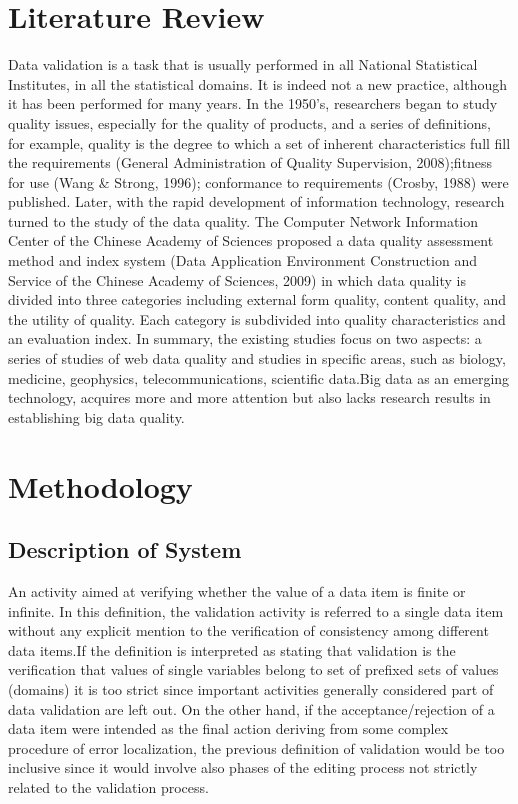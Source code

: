 \documentclass[12pt,]{article}
\begin{document}
\section{Literature Review}
Data validation is a task that is usually performed in all National Statistical Institutes, in all the statistical domains. It is indeed not a new practice, although it has been performed for many years. In the 1950's, researchers began to study quality issues, especially for the quality of products, and a series of definitions, for example, quality is the degree to which a set of inherent characteristics full fill the requirements (General Administration of Quality Supervision, 2008);fitness for use (Wang & Strong, 1996); conformance to requirements (Crosby, 1988) were published. Later, with the rapid development of information technology, research turned to the study of the data quality. 
The Computer Network Information Center of the Chinese Academy of Sciences proposed a data quality assessment method and index system (Data Application Environment Construction and Service of the Chinese Academy of Sciences, 2009) in which data quality is divided into three categories including external form quality, content quality, and the utility of quality. Each category is subdivided into quality characteristics and an evaluation index. 
In summary, the existing studies focus on two aspects: a series of studies of web data quality and studies in specific areas, such as biology, medicine, geophysics, telecommunications, scientific data.Big data as an emerging technology, acquires more and more attention but also lacks research results in establishing big data quality.

\section{Methodology}
\subsection{Description of System}
An activity aimed at verifying whether the value of a data item is finite or infinite.
In this definition, the validation activity is referred to a single data item without any explicit mention to the verification of consistency among different data items.If the definition is interpreted as stating that validation is the verification that values of single variables belong to set of prefixed sets of values (domains) it is too strict since important activities generally considered part of data validation are left out. On the other hand, if the acceptance/rejection of a data item were intended as the final action deriving from some complex procedure of error localization, the previous definition of validation would be too inclusive since it would involve also phases of the editing process not strictly related to the validation process.
\end{document}
